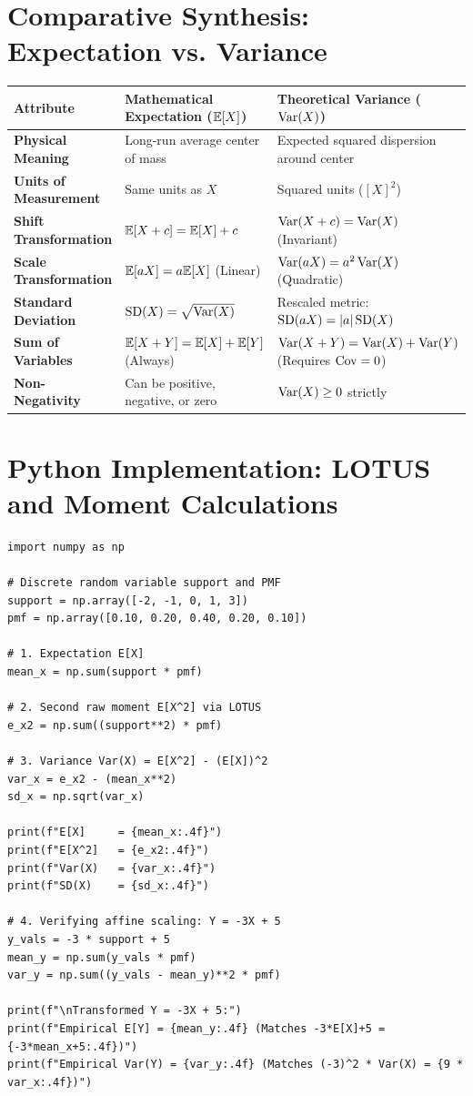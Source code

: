 \section{Comparative Synthesis: Expectation vs. Variance}

\begin{center}
\renewcommand{\arraystretch}{1.3}
\begin{tabular}{p{3.2cm}p{4.2cm}p{4.2cm}}
\toprule
\textbf{Attribute} & \textbf{Mathematical Expectation ($\mathbb{E}[X]$)} & \textbf{Theoretical Variance ($\operatorname{Var}(X)$)} \\
\midrule
\textbf{Physical Meaning} & Long-run average center of mass & Expected squared dispersion around center \\
\textbf{Units of Measurement} & Same units as $X$ & Squared units ($[X]^2$) \\
\textbf{Shift Transformation} & $\mathbb{E}[X + c] = \mathbb{E}[X] + c$ & $\operatorname{Var}(X + c) = \operatorname{Var}(X)$ (Invariant) \\
\textbf{Scale Transformation} & $\mathbb{E}[aX] = a\mathbb{E}[X]$ (Linear) & $\operatorname{Var}(aX) = a^2\operatorname{Var}(X)$ (Quadratic) \\
\textbf{Standard Deviation} & $\operatorname{SD}(X) = \sqrt{\operatorname{Var}(X)}$ & Rescaled metric: $\operatorname{SD}(aX) = |a|\operatorname{SD}(X)$ \\
\textbf{Sum of Variables} & $\mathbb{E}[X + Y] = \mathbb{E}[X] + \mathbb{E}[Y]$ (Always) & $\operatorname{Var}(X + Y) = \operatorname{Var}(X) + \operatorname{Var}(Y)$ (Requires $\operatorname{Cov}=0$) \\
\textbf{Non-Negativity} & Can be positive, negative, or zero & $\operatorname{Var}(X) \ge 0$ strictly \\
\bottomrule
\end{tabular}
\end{center}

\section{Python Implementation: LOTUS and Moment Calculations}

\begin{lstlisting}[caption={Numerical Verification of LOTUS and Linearity in Python}]
import numpy as np

# Discrete random variable support and PMF
support = np.array([-2, -1, 0, 1, 3])
pmf = np.array([0.10, 0.20, 0.40, 0.20, 0.10])

# 1. Expectation E[X]
mean_x = np.sum(support * pmf)

# 2. Second raw moment E[X^2] via LOTUS
e_x2 = np.sum((support**2) * pmf)

# 3. Variance Var(X) = E[X^2] - (E[X])^2
var_x = e_x2 - (mean_x**2)
sd_x = np.sqrt(var_x)

print(f"E[X]     = {mean_x:.4f}")
print(f"E[X^2]   = {e_x2:.4f}")
print(f"Var(X)   = {var_x:.4f}")
print(f"SD(X)    = {sd_x:.4f}")

# 4. Verifying affine scaling: Y = -3X + 5
y_vals = -3 * support + 5
mean_y = np.sum(y_vals * pmf)
var_y = np.sum((y_vals - mean_y)**2 * pmf)

print(f"\nTransformed Y = -3X + 5:")
print(f"Empirical E[Y] = {mean_y:.4f} (Matches -3*E[X]+5 = {-3*mean_x+5:.4f})")
print(f"Empirical Var(Y) = {var_y:.4f} (Matches (-3)^2 * Var(X) = {9 * var_x:.4f})")
\end{lstlisting}

